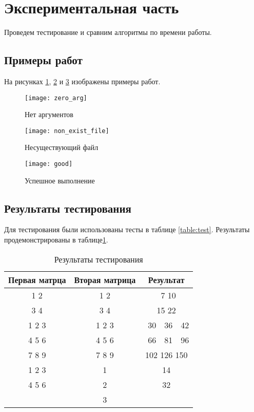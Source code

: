 \newpage
\section{Экспериментальная часть}

Проведем тестирование и сравним алгоритмы по времени работы.

\subsection{Примеры работ}

На рисунках \ref{img:zero}, \ref{img:nef} и \ref{img:good} изображены примеры работ.

\begin{figure}[H]
    \centering
    \texttt{[image: zero\_arg]}
    \caption{Нет аргументов}
    \label{img:zero}
\end{figure}

\begin{figure}[H]
    \centering
    \texttt{[image: non\_exist\_file]}
    \caption{Несуществующий файл}
    \label{img:nef}
\end{figure}

\begin{figure}[H]
    \centering
    \texttt{[image: good]}
    \caption{Успешное выполнение}
    \label{img:good}
\end{figure}

\subsection{Результаты тестирования}

Для тестирования были использованы тесты в таблице \ref{table:test}.
Результаты продемонстрированы в таблице\ref{table:test-res}.

\begin{table}[H]
    \caption{Результаты тестирования}
    \label{table:test-res}
    \centering
    \begin{tabular}{|c|c|c|}
        \hline
        Первая матрца & Вторая матрица & Результат \\
        \hline
        1 2 & 1 2 & \ 7 10 \\
        3 4 & 3 4 & 15 22 \\
        \hline
        1 2 3 & 1 2 3 & \ 30\ \ 36\ \ 42 \\
        4 5 6 & 4 5 6 & \ 66\ \ 81\ \ 96 \\
        7 8 9 & 7 8 9 & 102 126 150 \\
        \hline
        1 2 3 & 1 & 14 \\
        4 5 6 & 2 & 32 \\
              & 3 & \\
        \hline
    \end{tabular}
\end{table}

